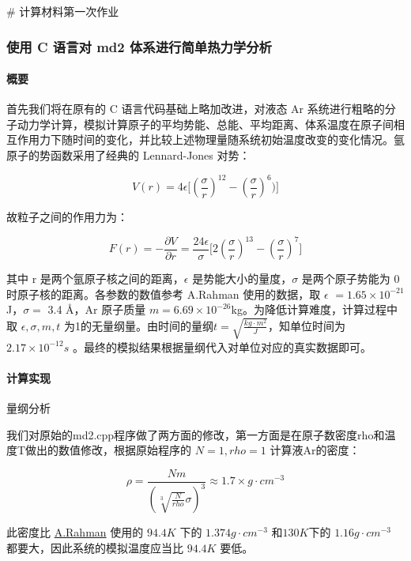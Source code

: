 \documentclass[
]{article}
\author{}
\date{}
\begin{document}
\# 计算材料第一次作业

\hypertarget{header-n4}{%
\subsubsection{使用 C 语言对 md2
体系进行简单热力学分析}\label{header-n4}}

\hypertarget{header-n5}{%
\paragraph{概要}\label{header-n5}}

首先我们将在原有的 C 语言代码基础上略加改进，对液态 Ar
系统进行粗略的分子动力学计算，模拟计算原子的平均势能、总能、平均距离、体系温度在原子间相互作用力下随时间的变化，并比较上述物理量随系统初始温度改变的变化情况。氩原子的势函数采用了经典的
Lennard-Jones 对势：

\[V(r) =  4\epsilon \lbrack (\frac{\sigma}{r})^{12}-(\frac{\sigma}{r})^6) \rbrack\]

故粒子之间的作用力为：

\[F(r)=-\frac{\partial V}{\partial r} = \frac{24\epsilon}{\sigma} \lbrack 2(\frac{\sigma}{r})^{13}-(\frac{\sigma}{r})^7 \rbrack\]

其中 r 是两个氩原子核之间的距离，\(\epsilon\)
是势能大小的量度，\(\sigma\) 是两个原子势能为 0
时原子核的距离。各参数的数值参考 A.Rahman 使用的数据，取 \(\epsilon\)
\(=1.65\times10^{-21}\)J，\(\sigma =\) 3.4 Å，Ar 原子质量
\(m=6.69\times10^{-26}\)kg。为降低计算难度，计算过程中取
\(\epsilon,\sigma,m,t\)
为1的无量纲量。由时间的量纲\(t=\sqrt{\frac{kg·m^2}{J}}\)，知单位时间为
\(2.17\times10^{-12}s\)
。最终的模拟结果根据量纲代入对单位对应的真实数据即可。

\hypertarget{header-n11}{%
\paragraph{计算实现}\label{header-n11}}

量纲分析

我们对原始的md2.cpp程序做了两方面的修改，第一方面是在原子数密度rho和温度T做出的数值修改，根据原始程序的
\(N=1, rho=1\) 计算液Ar的密度：

\[\rho=\frac{Nm}{(\sqrt[3]{\frac{N}{rho}} \sigma)^3 } \approx 1.7 \times g·cm^{-3}\]

此密度比 \href{reference/rahman1964.pdf}{A.Rahman} 使用的 \(94.4K\) 下的
\(1.374g·cm^{-3}\) 和\(130K\)下的 \(1.16g·cm^{-3}\)
都要大，因此系统的模拟温度应当比 \(94.4K\) 要低。
\end{document}
